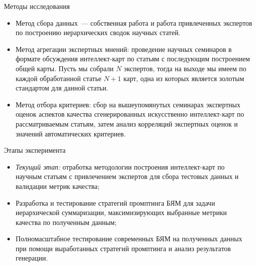 \documentclass{beamer}
\begin{document}

\begin{frame}{Методы исследования}
    
\begin{itemize}
    \item Метод сбора данных~--- собственная работа и работа привлеченных экспертов по построению иерархических сводок научных статей.
    \item Метод агрегации экспертных мнений: проведение научных семинаров в формате обсуждения интеллект-карт по статьям с последующим построением общей карты. Пусть мы собрали $N$ экспертов, тогда на выходе мы имеем по каждой обработанной статье $N+1$ карт, одна из которых является золотым стандартом для данной статьи.
    \item Метод отбора критериев: сбор на вышеупомянутых семинарах экспертных оценок аспектов качества сгенерированных искусственно интеллект-карт по рассматриваемым статьям, затем анализ корреляций экспертных оценок и значений автоматических критериев.
\end{itemize}

\end{frame}


\begin{frame}{Этапы эксперимента}

\begin{itemize}
    \item \textit{Текущий этап:} отработка методологии построения интеллект-карт по научным статьям с привлечением экспертов для сбора тестовых данных и валидации метрик качества;
    \item Разработка и тестирование стратегий промптинга БЯМ для задачи иерархической суммаризации, максимизирующих выбранные метрики качества по полученным данным;
    \item Полномасштабное тестирование современных БЯМ на полученных данных при помощи выработанных стратегий промптинга и анализ результатов генерации.
\end{itemize}

\end{frame}

\end{document}
